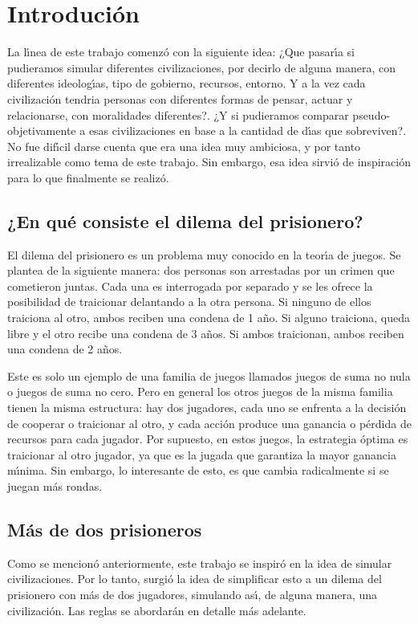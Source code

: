 \documentclass{article}
\begin{document}
\maketitle
\newpage
\tableofcontents
\newpage

\section{Introduci\'on}
La l\'{\i}nea de este trabajo comenz\'o con la siguiente idea: ¿Que pasar\'{\i}a si pudieramos simular diferentes civilizaciones, por
decirlo de alguna manera, con diferentes ideolog\'{\i}as, tipo de gobierno, recursos, entorno. Y a la vez cada civilizaci\'on tendria
personas con diferentes formas de pensar, actuar y relacionarse, con moralidades diferentes?. ¿Y si pudieramos comparar pseudo-objetivamente
a esas civilizaciones en base a la cantidad de d\'{\i}as que sobreviven?. No fue dif\'{\i}cil darse cuenta que era una idea muy ambiciosa, y por
tanto irrealizable como tema de este trabajo. Sin embargo, esa idea sirvi\'o de inspiraci\'on para lo que finalmente se realiz\'o.

\subsection*{¿En qu\'e consiste el dilema del prisionero?}
El dilema del prisionero es un problema muy conocido en la teor\'{\i}a de juegos. Se plantea de la siguiente manera: dos personas son arrestadas por
un crimen que cometieron juntas. Cada una es interrogada por separado y se les ofrece la posibilidad de traicionar delantando a la otra persona. Si ninguno de
ellos traiciona al otro, ambos reciben una condena de 1 a\~no. Si alguno traiciona, queda libre y el otro recibe una condena de 3 a\~nos. Si ambos traicionan,
ambos reciben una condena de 2 a\~nos.

Este es solo un ejemplo de una familia de juegos llamados juegos de suma no nula o juegos de suma no cero. Pero en general los otros juegos de la misma familia
tienen la misma estructura: hay dos jugadores, cada uno se enfrenta a la decisi\'on de cooperar o traicionar al otro, y cada acci\'on produce una ganancia o
p\'erdida de recursos para cada jugador. Por supuesto, en estos juegos, la estrategia \'optima es traicionar al otro jugador, ya que es la jugada que garantiza
la mayor ganancia m\'{\i}nima. Sin embargo, lo interesante de esto, es que cambia radicalmente si se juegan m\'as rondas.

\subsection*{M\'as de dos prisioneros}
Como se mencion\'o anteriormente, este trabajo se inspir\'o en la idea de simular civilizaciones. Por lo tanto, surgi\'o la idea de simplificar esto
a un dilema del prisionero con m\'as de dos jugadores, simulando as\'{\i}, de alguna manera, una civilizaci\'on. Las reglas se abordar\'an en detalle
m\'as adelante.
\newpage
\end{document}
